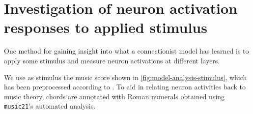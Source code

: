 \documentclass[dissertation.tex]{subfiles}
\begin{document}

\section{Investigation of neuron activation responses to applied stimulus}

One method for gaining insight into what a connectionist model has learned is
to apply some stimulus and measure neuron activations at different layers.

We use as stimulus the music score shown in
\cref{fig:model-analysis-stimulus}, which has been preprocessed according to
. To aid in relating neuron activities back to music
theory, chords are annotated with Roman numerals obtained using {\tt music21}'s
automated analysis.
\end{document}
